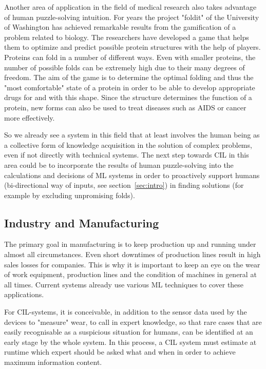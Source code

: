 \documentclass[conference]{IEEEtran}
\begin{document}
Another area of application in the field of medical research also takes advantage of human puzzle-solving intuition. 
For years the project "foldit" of the University of Washington has achieved remarkable results\cite{Foldit:results} from the gamification of a problem related to biology.
The researchers have developed a game that helps them to optimize and predict possible protein structures with the help of 
players\cite{Foldit:web}.
Proteins can fold in a number of different ways. Even with smaller proteins, the number of possible folds can be extremely high due to their many degrees of freedom.
The aim of the game is to determine the optimal folding and thus the "most comfortable" state of a protein in order to be able to develop appropriate drugs for and with this shape.
Since the structure determines the function of a protein\cite{Foldit:web}, new forms can also be used to treat diseases such as AIDS or cancer more effectively.

So we already see a system in this field that at least involves the human being as a collective form of knowledge acquisition in the solution of complex problems, even if not directly with technical systems.
The next step towards CIL in this area could be to incorporate the results of human puzzle-solving into the calculations and decisions of ML systems in order to proactively support humans (bi-directional way of inputs, see section~\ref{sec:intro}) in finding solutions (for example by excluding unpromising folds).


\subsection{Industry and Manufacturing}
The primary goal in manufacturing is to keep production up and running under almost all circumstances. 
Even short downtimes of production lines result in high sales losses for companies.
This is why it is important to keep an eye on the wear of work equipment, production lines and the condition of machines in general at all times.
Current systems already use various ML techniques\cite{Manu:wuest} to cover these applications.

For CIL-systems, it is conceivable, in addition to the sensor data used by the devices to "measure" wear, to call in expert knowledge, so that rare cases that are easily recognisable as a suspicious situation for humans, can be identified at an early stage by the whole system.
In this process, a CIL system must estimate at runtime which expert should be asked what and when in order 
to achieve maximum information content.
\end{document}
